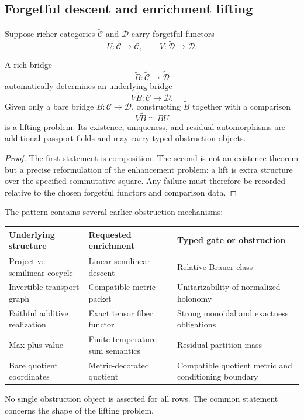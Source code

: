 \subsection{Forgetful descent and enrichment lifting}
\label{subsec:block19-doctrine-lifting}

Suppose richer categories \(\widetilde{\mathcal C}\) and \(\widetilde{\mathcal D}\) carry forgetful functors
\[
 U:\widetilde{\mathcal C}\to\mathcal C,
 \qquad
 V:\widetilde{\mathcal D}\to\mathcal D.
\]

\begin{proposition}
\label{prop:block19-forgetful-lifting}
A rich bridge
\[
 \widetilde B:\widetilde{\mathcal C}\to\widetilde{\mathcal D}
\]
automatically determines an underlying bridge
\[
 V\widetilde B:\widetilde{\mathcal C}\to\mathcal D.
\]
Given only a bare bridge \(B:\mathcal C\to\mathcal D\), constructing \(\widetilde B\) together with a comparison
\[
 V\widetilde B\cong BU
\]
is a lifting problem.  Its existence, uniqueness, and residual automorphisms are additional passport fields and may carry typed obstruction objects.
\end{proposition}

\begin{proof}
The first statement is composition.  The second is not an existence theorem but a precise reformulation of the enhancement problem: a lift is extra structure over the specified commutative square.  Any failure must therefore be recorded relative to the chosen forgetful functors and comparison data.
\end{proof}

The pattern contains several earlier obstruction mechanisms:
\begin{center}
\small
\begin{tabularx}{.96\textwidth}{@{}L{.26\textwidth}L{.28\textwidth}Y@{}}
\toprule
Underlying structure & Requested enrichment & Typed gate or obstruction\\
\midrule
Projective semilinear cocycle & Linear semilinear descent & Relative Brauer class\\
Invertible transport graph & Compatible metric packet & Unitarizability of normalized holonomy\\
Faithful additive realization & Exact tensor fiber functor & Strong monoidal and exactness obligations\\
Max-plus value & Finite-temperature sum semantics & Residual partition mass\\
Bare quotient coordinates & Metric-decorated quotient & Compatible quotient metric and conditioning boundary\\
\bottomrule
\end{tabularx}
\end{center}
No single obstruction object is asserted for all rows.  The common statement concerns the shape of the lifting problem.

